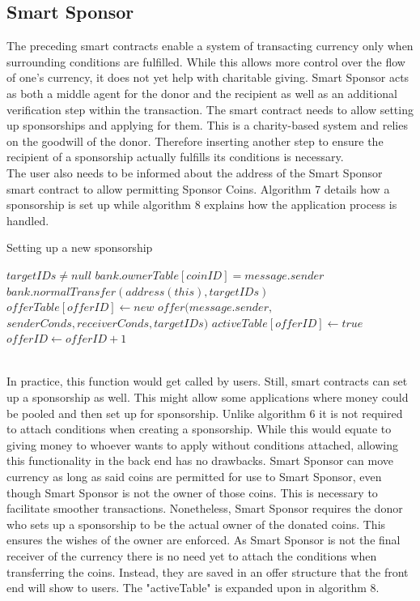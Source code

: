 \subsection{Smart Sponsor}
The preceding smart contracts enable a system of transacting currency only when surrounding conditions are fulfilled. While this allows more control over the flow of one's currency, it does not yet help with charitable giving. Smart Sponsor acts as both a middle agent for the donor and the recipient as well as an additional verification step within the transaction. The smart contract needs to allow setting up sponsorships and applying for them. This is a charity-based system and relies on the goodwill of the donor. Therefore inserting another step to ensure the recipient of a sponsorship actually fulfills its conditions is necessary.\\
The user also needs to be informed about the address of the Smart Sponsor smart contract to allow permitting Sponsor Coins. Algorithm 7 details how a sponsorship is set up while algorithm 8 explains how the application process is handled.\\
\begin{algorithm}
\caption{Setting up a new sponsorship}\label{alg:sponsor}
\begin{algorithmic}
\Require $targetIDs \neq null$
\Ensure $bank.ownerTable[coinID] = message.sender$
\EndFor \\
$bank.normalTransfer(address(this), targetIDs)$
\State $offerTable[offerID] \gets new$ $offer(message.sender,$\\ 
\hspace{70pt} $senderConds, receiverConds, targetIDs)$
\State $activeTable[offerID] \gets true$
\State $offerID \gets offerID + 1$
\end{algorithmic}
\end{algorithm}
\\
In practice, this function would get called by users. Still, smart contracts can set up a sponsorship as well. This might allow some applications where money could be pooled and then set up for sponsorship. Unlike algorithm 6 it is not required to attach conditions when creating a sponsorship. While this would equate to giving money to whoever wants to apply without conditions attached, allowing this functionality in the back end has no drawbacks. Smart Sponsor can move currency as long as said coins are permitted for use to Smart Sponsor, even though Smart Sponsor is not the owner of those coins. This is necessary to facilitate smoother transactions. Nonetheless, Smart Sponsor requires the donor who sets up a sponsorship to be the actual owner of the donated coins. This ensures the wishes of the owner are enforced. As Smart Sponsor is not the final receiver of the currency there is no need yet to attach the conditions when transferring the coins. Instead, they are saved in an offer structure that the front end will show to users. The "activeTable" is expanded upon in algorithm 8.\\

